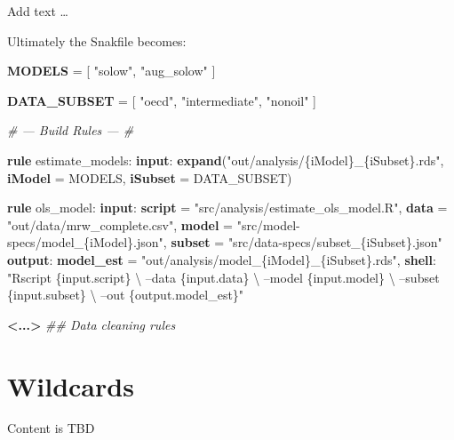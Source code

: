 \documentclass[]{book}
\newenvironment{Shaded}{\begin{snugshade}}{\end{snugshade}}
\newcommand{\KeywordTok}[1]{\textcolor[rgb]{0.13,0.29,0.53}{\textbf{{#1}}}}
\newcommand{\StringTok}[1]{\textcolor[rgb]{0.31,0.60,0.02}{{#1}}}
\newcommand{\CommentTok}[1]{\textcolor[rgb]{0.56,0.35,0.01}{\textit{{#1}}}}
\newcommand{\NormalTok}[1]{{#1}}
\theoremstyle{definition}
\theoremstyle{definition}
\theoremstyle{definition}
\theoremstyle{remark}
\begin{document}
Add text \ldots{}

Ultimately the Snakfile becomes:

\begin{Shaded}
\begin{Highlighting}[]
\KeywordTok{MODELS} \NormalTok{= [}
          \StringTok{"solow"}\NormalTok{,}
          \StringTok{"aug_solow"}
          \NormalTok{]}

\KeywordTok{DATA_SUBSET} \NormalTok{= [}
                \StringTok{"oecd"}\NormalTok{,}
                \StringTok{"intermediate"}\NormalTok{,}
                \StringTok{"nonoil"}
                \NormalTok{]}

\CommentTok{# --- Build Rules --- #}

\KeywordTok{rule} \NormalTok{estimate_models:}
    \KeywordTok{input}\NormalTok{:}
        \KeywordTok{expand}\NormalTok{(}\StringTok{"out/analysis/\{iModel\}_\{iSubset\}.rds"}\NormalTok{,}
                    \KeywordTok{iModel} \NormalTok{= MODELS,}
                    \KeywordTok{iSubset} \NormalTok{= DATA_SUBSET)}

\KeywordTok{rule} \NormalTok{ols_model:}
    \KeywordTok{input}\NormalTok{:}
        \KeywordTok{script} \NormalTok{= }\StringTok{"src/analysis/estimate_ols_model.R"}\NormalTok{,}
        \KeywordTok{data}   \NormalTok{= }\StringTok{"out/data/mrw_complete.csv"}\NormalTok{,}
        \KeywordTok{model}  \NormalTok{= }\StringTok{"src/model-specs/model_\{iModel\}.json"}\NormalTok{,}
        \KeywordTok{subset} \NormalTok{= }\StringTok{"src/data-specs/subset_\{iSubset\}.json"}
    \KeywordTok{output}\NormalTok{:}
        \KeywordTok{model_est} \NormalTok{= }\StringTok{"out/analysis/model_\{iModel\}_\{iSubset\}.rds"}\NormalTok{,}
    \KeywordTok{shell}\NormalTok{:}
        \StringTok{"Rscript \{input.script\} \textbackslash{}}
\StringTok{            --data \{input.data\} \textbackslash{}}
\StringTok{            --model \{input.model\} \textbackslash{}}
\StringTok{            --subset \{input.subset\} \textbackslash{}}
\StringTok{            --out \{output.model_est\}"}

\KeywordTok{<...>} \CommentTok{## Data cleaning rules}
\end{Highlighting}
\end{Shaded}

\chapter{Wildcards}\label{wildcards-1}

Content is TBD
\end{document}
